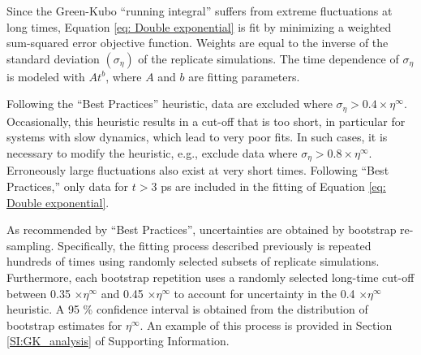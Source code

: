 \documentclass[preprint,review,12pt]{elsarticle}
\begin{document}
	
	Since the Green-Kubo ``running integral'' suffers from extreme fluctuations at long times, Equation \ref{eq: Double exponential} is fit by minimizing a weighted sum-squared error objective function. Weights are equal to the inverse of the standard deviation $(\sigma_{\eta})$ of the replicate simulations. The time dependence of $\sigma_{\eta}$ is modeled with $A t^{b}$, where $A$ and $b$ are fitting parameters.
	
	Following the ``Best Practices'' heuristic, data are excluded where $\sigma_{\eta} > 0.4 \times \eta^{\infty}$. Occasionally, this heuristic results in a cut-off that is too short, in particular for systems with slow dynamics, which lead to very poor fits. In such cases, it is necessary to modify the heuristic, e.g., exclude data where $\sigma_{\eta} > 0.8 \times \eta^{\infty}$. Erroneously large fluctuations also exist at very short times. Following ``Best Practices,'' only data for $t > 3$ ps are included in the fitting of Equation \ref{eq: Double exponential}. 
	 
	
	As recommended by ``Best Practices'', uncertainties are obtained by bootstrap re-sampling. Specifically, the fitting process described previously is repeated hundreds of times using randomly selected subsets of replicate simulations. Furthermore, each bootstrap repetition uses a randomly selected long-time cut-off between 0.35 $\times \eta^{\infty}$ and 0.45 $\times \eta^{\infty}$ to account for uncertainty in the 0.4 $\times \eta^{\infty}$ heuristic. A 95 \% confidence interval is obtained from the distribution of bootstrap estimates for $\eta^\infty$. An example of this process is provided in Section \ref{SI:GK_analysis} of Supporting Information.
	
\end{document}
